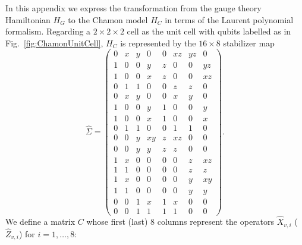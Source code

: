 \documentclass[prx,twocolumn,superscriptaddress,nofootinbib,showpacs,notitlepage]{revtex4-2}
\begin{document}
In this appendix we express the transformation from the gauge theory Hamiltonian $H_G$ to the Chamon model $H_C$ in terms of the Laurent polynomial formalism. Regarding a $2\times2\times2$ cell as the unit cell with qubits labelled as in Fig.~\ref{fig:ChamonUnitCell}, $H_C$ is represented by the $16\times 8$ stabilizer map
\begin{equation}
    \widehat{\Sigma}=\begin{pmatrix}
    0 & x & y & 0 & 0 & xz & yz & 0 \\
    1 & 0 & 0 & y & z & 0 & 0 & yz \\
    1 & 0 & 0 & x & z & 0 & 0 & xz \\
    0 & 1 & 1 & 0 & 0 & z & z & 0 \\
    0 & x & y & 0 & 0 & x & y & 0 \\
    1 & 0 & 0 & y & 1 & 0 & 0 & y \\
    1 & 0 & 0 & x & 1 & 0 & 0 & x \\
    0 & 1 & 1 & 0 & 0 & 1 & 1 & 0 \\
    0 & 0 & y & xy & z & xz & 0 & 0 \\
    0 & 0 & y & y & z & z & 0 & 0 \\
    1 & x & 0 & 0 & 0 & 0 & z & xz \\
    1 & 1 & 0 & 0 & 0 & 0 & z & z \\
    1 & x & 0 & 0 & 0 & 0 & y & xy \\
    1 & 1 & 0 & 0 & 0 & 0 & y & y \\
    0 & 0 & 1 & x & 1 & x & 0 & 0 \\
    0 & 0 & 1 & 1 & 1 & 1 & 0 & 0 
    \end{pmatrix}.
\end{equation}
We define a matrix $C$ whose first (last) 8 columns represent the operators $\widehat{X}_{v,i}$ ($\widehat{Z}_{v,i}$) for $i=1,\ldots,8$:
\end{document}
